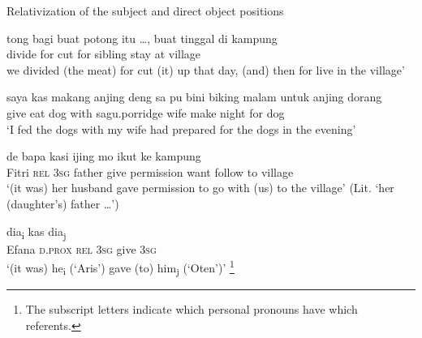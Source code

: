 \begin{styleExampleTitle}
Relativization of the subject and direct object positions
\end{styleExampleTitle}
\ea
\label{Example_14.62}
\gll tong  bagi  buat      {}  potong  itu  {{\ldots},} buat      {}  tinggal  di  kampung\\  
  divide  for     {}  cut   {}  for  sibling   {}    stay  at  village\\
 we divided (the meat) for  cut (it) up that day, (and) then for  live in the village’ \textstyleExampleSource{[080919-003-NP.0014]}
\z

\ea
\label{Example_14.63}
\gll saya  kas  makang  anjing  deng      sa  pu bini  biking   {}  malam  untuk  anjing  dorang\\  
  give  eat  dog  with  sagu.porridge       wife  make  {}  night  for  dog  \\
\glt ‘I fed the dogs with  my wife had prepared for the dogs in the evening’ \textstyleExampleSource{[080919-003-NP.0002]}
\z

\ea\label{Example_14.64}
 {} {de} {bapa} {kasi} {} {ijing} {mo} {ikut} {ke} {kampung}\\ %
 Fitri  \textsc{rel}  \textsc{3sg}  father  give  {}  permission  want  follow  to  village\\
\glt ‘(it was)  her husband gave permission to go with (us) to the village’ (Lit. ‘her (daughter’s) father {\ldots}’) \textstyleExampleSource{[080925-003-Cv.0211]}
\z

\ea\label{Example_14.65}
 {} {} {dia\textsubscript{i}} {kas} {dia\textsubscript{j}} {}\\ %
 Efana  \textsc{d.prox}  \textsc{rel}  \textsc{3sg}  give  \textsc{3sg}  \\
 ‘(it was)  he\textsubscript{i} (‘Aris’) gave (to) him\textsubscript{j} (‘Oten’)’ \textstyleExampleSource{[080922-010a-CvNF.0062]}\footnote{The subscript letters indicate which personal pronouns have which referents.}
\z

